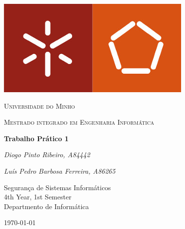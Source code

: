 \documentclass[12pt]{article}
\begin{document}
\thispagestyle{empty}
\setlength\headheight{0pt} 
\begin{center}

\begin{center}
\includegraphics[width=0.45\linewidth]{img/um_logo.jpg}            
\end{center}	

        \vspace{0.25cm}
        {\scshape\LARGE Universidade do Minho \par}
        \vspace{0.25cm}
        {\scshape\Large Mestrado integrado em Engenharia Informática\par}
        \vspace{0.5cm}

        {\Large\bfseries Trabalho Prático 1\par}
        
        \vspace{0.5cm}
        {\Large\itshape Diogo Pinto Ribeiro, A84442\par}
        {\Large\itshape Luís Pedro Barbosa Ferreira, A86265\par}
        \vspace{0.25cm}

\vspace{1cm}
Segurança de Sistemas Informáticos \\
4th Year, 1st Semester \\
Departmento de Informática\par
\vspace{1.5cm}
\large
\today

\end{center}

\clearpage
\restoregeometry
\justify

%
%
%

\renewcommand{\contentsname}{Contents}
\tableofcontents
\pagebreak

 









\printbibliography
\end{document}
